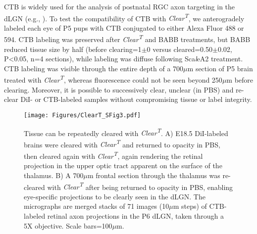 CTB is widely used for the analysis of postnatal RGC axon targeting in the dLGN (e.g., ).
To test the compatibility of CTB with \emph{Clear\textsuperscript{T}}, we anterogradely labeled each eye of P5 pups with CTB conjugated to either Alexa Fluor 488 or 594.
CTB labeling was preserved after \emph{Clear\textsuperscript{T}} and BABB treatments, but BABB reduced tissue size by half (before clearing=1$\pm$0 versus cleared=0.50$\pm$0.02, P<0.05, n=4 sections), while labeling was diffuse following Sca\emph{l}eA2 treatment. %
CTB labeling was visible through the entire depth of a 700$\mu$m section of P5 brain treated with \emph{Clear\textsuperscript{T}}, whereas fluorescence could not be seen beyond 250$\mu$m before clearing. %
Moreover, it is possible to successively clear, unclear (in PBS) and re-clear DiI- or CTB-labeled samples without compromising tissue or label integrity. %
\begin{figure}[hbtp]
    \begin{center}
        \texttt{[image: Figures/ClearT\_SFig3.pdf]}
        \caption[Tissue can be repeatedly cleared with \emph{Clear\textsuperscript{T}}.]
        {Tissue can be repeatedly cleared with \emph{Clear\textsuperscript{T}}.
        A) E18.5 DiI-labeled brains were cleared with \emph{Clear\textsuperscript{T}} and returned to opacity in PBS, then cleared again with \emph{Clear\textsuperscript{T}}, again rendering the retinal projection in the upper optic tract apparent on the surface of the thalamus.
        B) A 700$\mu$m frontal section through the thalamus was re-cleared with \emph{Clear\textsuperscript{T}} after being returned to opacity in PBS, enabling eye-specific projections to be clearly seen in the dLGN.
        The micrographs are merged stacks of 71 images (10$\mu$m steps) of CTB-labeled retinal axon projections in the P6 dLGN, taken through a 5X objective.
        Scale bars=100$\mu$m.
        }
        \label{ClearT\_SFig3}
    \end{center}
\end{figure}
